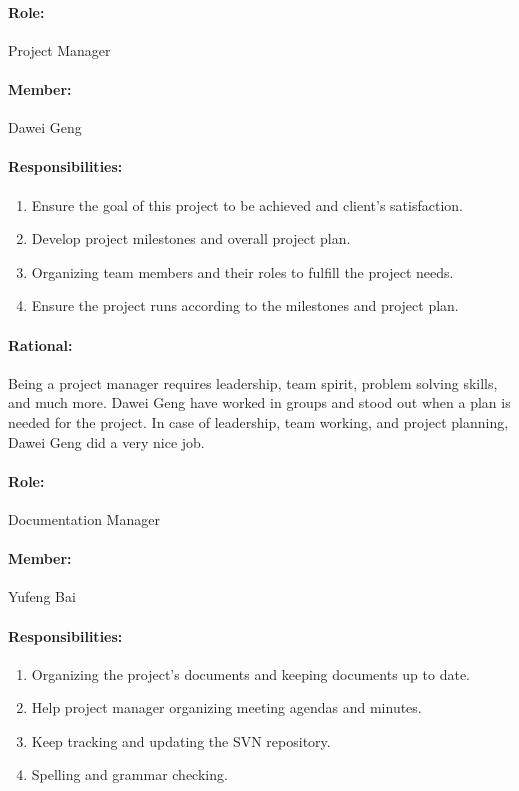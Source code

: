 \documentclass[11pt, a4paper]{report}
\begin{document}
\paragraph{Role: } Project Manager
\paragraph{Member: } Dawei Geng
\paragraph{Responsibilities: }
\begin{enumerate}
	\item  Ensure the goal of this project to be achieved and client's satisfaction.
	\item  Develop project milestones and overall project plan.
	\item  Organizing team members and their roles to fulfill the project needs.
	\item  Ensure the project runs according to the milestones and project plan.
\end{enumerate}
\paragraph{Rational: \\}
Being a project manager requires leadership, team spirit, problem solving skills, and much more. Dawei Geng have worked in groups and stood out when a plan is needed for the project. In case of leadership, team working, and project planning, Dawei Geng did a very nice job. 

\paragraph{Role: } Documentation Manager
\paragraph{Member: } Yufeng Bai
\paragraph{Responsibilities: }
\begin{enumerate}
	\item  Organizing the project's documents and keeping documents up to date.
	\item  Help project manager organizing meeting agendas and minutes.
	\item  Keep tracking and updating the SVN repository.
	\item  Spelling and grammar checking.
\end{enumerate}
\end{document}
